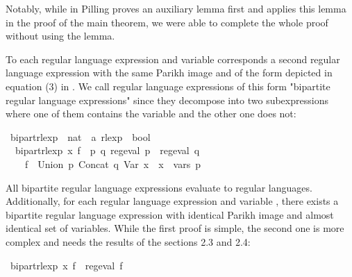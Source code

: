 \begin{isabellebody}
\begin{isamarkuptext}
Notably, while in \cite{Pilling} Pilling proves an auxiliary lemma first and applies this lemma in
the proof of the main theorem, we were able to complete the whole proof without using the lemma.%
\end{isamarkuptext}\isamarkuptrue%
%
\isadelimdocument
%
\endisadelimdocument
%
\isatagdocument
%
\isamarkuptrue%
%
\endisatagdocument
{\isafolddocument}%
%
\isadelimdocument
%
\endisadelimdocument
%
\begin{isamarkuptext}%
To each  regular language expression and variable  corresponds a second
regular language expression with the same Parikh image and of the form depicted in equation (3) in
\cite{Pilling}. We call regular language expressions of this form "bipartite regular language
expressions" since they decompose into two subexpressions where one of them contains the variable
 and the other one does not:%
\end{isamarkuptext}\isamarkuptrue%
\isamarkupfalse%
\ bipart{\isacharunderscore}{\kern0pt}rlexp\ {\isacharcolon}{\kern0pt}{\isacharcolon}{\kern0pt}\ {\isachardoublequoteopen}nat\ {\isasymRightarrow}\ {\isacharprime}{\kern0pt}a\ rlexp\ {\isasymRightarrow}\ bool{\isachardoublequoteclose}\ \isanewline
\ \ {\isachardoublequoteopen}bipart{\isacharunderscore}{\kern0pt}rlexp\ x\ f\ {\isasymequiv}\ {\isasymexists}p\ q{\isachardot}{\kern0pt}\ reg{\isacharunderscore}{\kern0pt}eval\ p\ {\isasymand}\ reg{\isacharunderscore}{\kern0pt}eval\ q\ {\isasymand}\isanewline
\ \ \ \ f\ {\isacharequal}{\kern0pt}\ Union\ p\ {\isacharparenleft}{\kern0pt}Concat\ q\ {\isacharparenleft}{\kern0pt}Var\ x{\isacharparenright}{\kern0pt}{\isacharparenright}{\kern0pt}\ {\isasymand}\ x\ {\isasymnotin}\ vars\ p{\isachardoublequoteclose}%
\begin{isamarkuptext}%
All bipartite regular language expressions evaluate to regular languages. Additionally,
for each  regular language expression and variable , there exists a bipartite
regular language expression with identical Parikh image and almost identical set of variables.
While the first proof is simple, the second one is more complex and needs the results of the
sections 2.3 and 2.4:%
\end{isamarkuptext}\isamarkuptrue%
\isamarkupfalse%
\ {\isachardoublequoteopen}bipart{\isacharunderscore}{\kern0pt}rlexp\ x\ f\ {\isasymLongrightarrow}\ reg{\isacharunderscore}{\kern0pt}eval\ f{\isachardoublequoteclose}\isanewline

\end{isabellebody}
